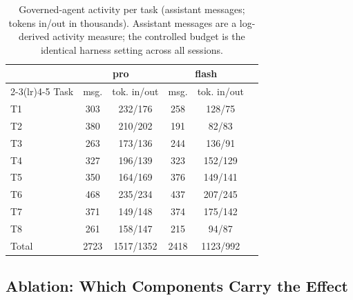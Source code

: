 \begin{table}[!ht]
\centering
\caption{Governed-agent activity per task (assistant messages; tokens in/out in
thousands). Assistant messages are a log-derived activity measure; the
controlled budget is the identical harness setting across all sessions.}
\label{tab:cost}
\begin{tabular}{lccccc}
\toprule
 & \multicolumn{2}{c}{pro} & \multicolumn{2}{c}{flash} \\
\cmidrule(lr){2-3}\cmidrule(lr){4-5}
Task & msg. & tok. in/out & msg. & tok. in/out \\
\midrule
T1 & 303 & 232/176 & 258 & 128/75 \\
T2 & 380 & 210/202 & 191 & 82/83 \\
T3 & 263 & 173/136 & 244 & 136/91 \\
T4 & 327 & 196/139 & 323 & 152/129 \\
T5 & 350 & 164/169 & 376 & 149/141 \\
T6 & 468 & 235/234 & 437 & 207/245 \\
T7 & 371 & 149/148 & 374 & 175/142 \\
T8 & 261 & 158/147 & 215 & 94/87 \\
\midrule
Total & 2723 & 1517/1352 & 2418 & 1123/992 \\
\bottomrule
\end{tabular}
\end{table}

\subsection{Ablation: Which Components Carry the Effect}

